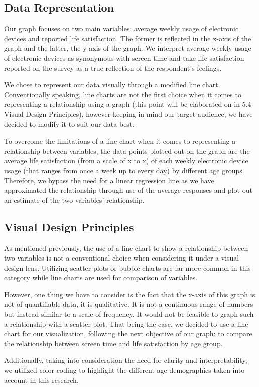 \documentclass[12pt, a4paper]{article}
\begin{document}
\subsection*{Data Representation}
\par Our graph focuses on two main variables: average weekly usage of electronic devices and reported life satisfaction. The former is reflected in the x-axis of the graph and the latter, the y-axis of the graph. We interpret average weekly usage of electronic devices as synonymous with screen time and take life satisfaction reported on the survey as a true reflection of the respondent’s feelings.
\par We chose to represent our data visually through a modified line chart. Conventionally speaking, line charts are not the first choice when it comes to representing a relationship using a graph (this point will be elaborated on in 5.4 Visual Design Principles), however keeping in mind our target audience, we have decided to modify it to suit our data best.
\par To overcome the limitations of a line chart when it comes to representing a relationship between variables, the data points plotted out on the graph are the average life satisfaction (from a scale of x to x) of each weekly electronic device usage (that ranges from once a week up to every day) by different age groups. Therefore, we bypass the need for a linear regression line as we have approximated the relationship through use of the average responses and plot out an estimate of the two variables’ relationship.

\subsection{Visual Design Principles}
\par As mentioned previously, the use of a line chart to show a relationship between two variables is not a conventional choice when considering it under a visual design lens. Utilizing scatter plots or bubble charts are far more common in this category while line charts are used for comparison of variables.
\par However, one thing we have to consider is the fact that the x-axis of this graph is not of quantifiable data, it is qualitative. It is not a continuous range of numbers but instead similar to a scale of frequency. It would not be feasible to graph such a relationship with a scatter plot. That being the case, we decided to use a line chart for our visualization, following the next objective of our graph: to compare the relationship between screen time and life satisfaction by age group.
\par Additionally, taking into consideration the need for clarity and interpretability, we utilized color coding to highlight the different age demographics taken into account in this research.
\end{document}
